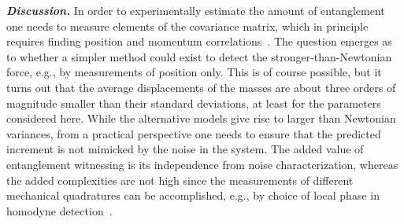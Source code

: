 \documentclass[aps,prd,reprint,superscriptaddress,nofootinbib,floatfix]{revtex4-2}
\begin{document}
\emph{\textbf{Discussion.}}
In order to experimentally estimate the amount of entanglement one needs to measure elements of the covariance matrix, which in principle requires finding position and momentum correlations~\cite{Aspelmeyer-CavOpt-Rev}. The question emerges as to whether a simpler method could exist to detect the stronger-than-Newtonian force, e.g., by measurements of position only. This is of course possible, but it turns out that the average displacements of the masses are about three orders of magnitude smaller than their standard deviations, at least for the parameters considered here.
While the alternative models give rise to larger than Newtonian variances, from a practical perspective one needs to ensure that the predicted increment is not mimicked by the noise in the system.
The added value of entanglement witnessing is its independence from noise characterization, whereas the added complexities are not high since the measurements of different mechanical quadratures can be accomplished, e.g., by choice of local phase in homodyne detection~\cite{Aspelmeyer-CavOpt-Rev}.
\end{document}
